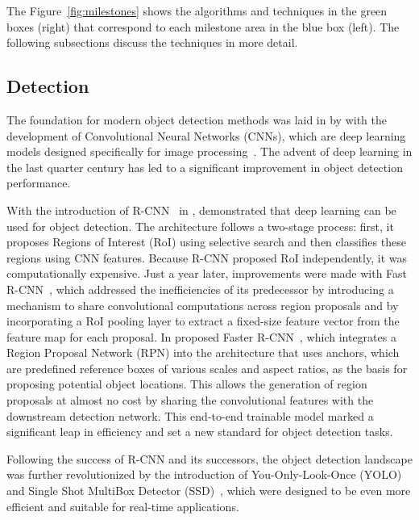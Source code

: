 The Figure~\ref{fig:milestones} shows the algorithms and techniques in the green boxes (right) that correspond to each milestone area in the blue box (left). The following subsections discuss the techniques in more detail.

\subsection{Detection}\label{subsec:milestone_detection}
The foundation for modern object detection methods was laid in \citeyear{Lecun98} by \citeauthor{Lecun98} with the development of Convolutional Neural Networks (CNNs), which are deep learning models designed specifically for image processing~\cite{Lecun98}. The advent of deep learning in the last quarter century has led to a significant improvement in object detection performance.

With the introduction of R-CNN~\cite{Girshick14} in \citeyear{Girshick14}, \citeauthor{Girshick14} demonstrated that deep learning can be used for object detection. The architecture follows a two-stage process: first, it proposes Regions of Interest (RoI) using selective search and then classifies these regions using CNN features. Because R-CNN proposed RoI independently, it was computationally expensive. Just a year later, improvements were made with Fast R-CNN~\cite{Girshick15}, which addressed the inefficiencies of its predecessor by introducing a mechanism to share convolutional computations across region proposals and by incorporating a RoI pooling layer to extract a fixed-size feature vector from the feature map for each proposal. In \citeyear{Ren17} \citeauthor{Ren17} proposed Faster R-CNN~\cite{Ren17}, which integrates a Region Proposal Network (RPN) into the architecture that uses anchors, which are predefined reference boxes of various scales and aspect ratios, as the basis for proposing potential object locations. This allows the generation of region proposals at almost no cost by sharing the convolutional features with the downstream detection network. This end-to-end trainable model marked a significant leap in efficiency and set a new standard for object detection tasks.

Following the success of R-CNN and its successors, the object detection landscape was further revolutionized by the introduction of You-Only-Look-Once (YOLO)~\cite{Redmon15} and Single Shot MultiBox Detector (SSD)~\cite{Liu16}, which were designed to be even more efficient and suitable for real-time applications.

